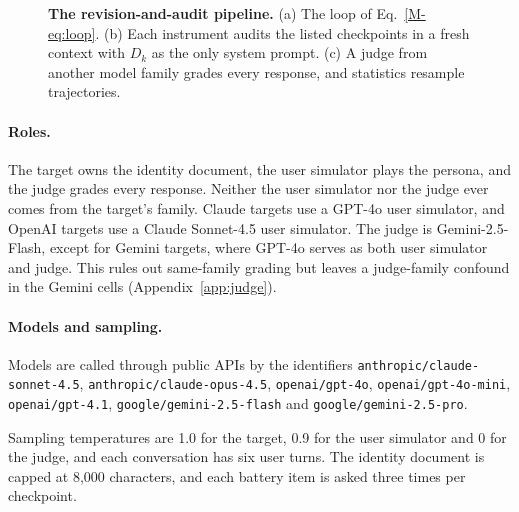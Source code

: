\begin{figure}[tp]
\centering

\caption{\textbf{The revision-and-audit pipeline.} (a) The loop of Eq.~\eqref{M-eq:loop}. (b) Each instrument audits the listed checkpoints in a fresh context with $D_k$ as the only system prompt. (c) A judge from another model family grades every response, and statistics resample trajectories.}
\label{fig:appsystem}
\end{figure}

\paragraph{Roles.}
The target owns the identity document, the user simulator plays the persona, and the judge grades every response.
Neither the user simulator nor the judge ever comes from the target's family.
Claude targets use a GPT-4o user simulator, and OpenAI targets use a Claude Sonnet-4.5 user simulator.
The judge is Gemini-2.5-Flash, except for Gemini targets, where GPT-4o serves as both user simulator and judge.
This rules out same-family grading but leaves a judge-family confound in the Gemini cells (Appendix~\ref{app:judge}).

\paragraph{Models and sampling.}
\begin{sloppypar}Models are called through public APIs by the identifiers \texttt{anthropic/\allowbreak claude-sonnet-4.5}, \texttt{anthropic/\allowbreak claude-opus-4.5}, \texttt{openai/\allowbreak gpt-4o}, \texttt{openai/\allowbreak gpt-4o-mini}, \texttt{openai/\allowbreak gpt-4.1}, \texttt{google/\allowbreak gemini-2.5-flash} and \texttt{google/\allowbreak gemini-2.5-pro}.\end{sloppypar}
Sampling temperatures are 1.0 for the target, 0.9 for the user simulator and 0 for the judge, and each conversation has six user turns.
The identity document is capped at 8{,}000 characters, and each battery item is asked three times per checkpoint.

